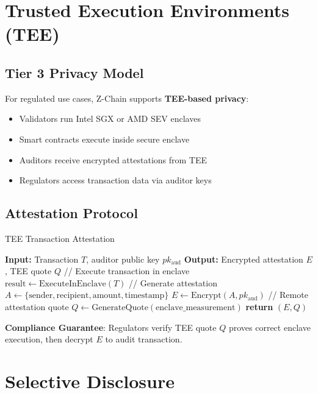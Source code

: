 \documentclass[11pt]{article}
\begin{document}
\section{Trusted Execution Environments (TEE)}

\subsection{Tier 3 Privacy Model}

For regulated use cases, Z-Chain supports \textbf{TEE-based privacy}:

\begin{itemize}[leftmargin=1.1em]
  \item Validators run Intel SGX or AMD SEV enclaves
  \item Smart contracts execute inside secure enclave
  \item Auditors receive encrypted attestations from TEE
  \item Regulators access transaction data via auditor keys
\end{itemize}

\subsection{Attestation Protocol}

\begin{algorithm}[H]
\caption{TEE Transaction Attestation}
\begin{algorithmic}[1]
\State \textbf{Input:} Transaction $T$, auditor public key $pk_{\text{aud}}$
\State \textbf{Output:} Encrypted attestation $E$, TEE quote $Q$
\State
\State // Execute transaction in enclave
\State $\text{result} \leftarrow \text{ExecuteInEnclave}(T)$
\State
\State // Generate attestation
\State $A \leftarrow \{\text{sender}, \text{recipient}, \text{amount}, \text{timestamp}\}$
\State $E \leftarrow \text{Encrypt}(A, pk_{\text{aud}})$ 
\State
\State // Remote attestation quote
\State $Q \leftarrow \text{GenerateQuote}(\text{enclave\_measurement})$
\State \textbf{return} $(E, Q)$
\end{algorithmic}
\end{algorithm}

\textbf{Compliance Guarantee}: Regulators verify TEE quote $Q$ proves correct enclave execution, then decrypt $E$ to audit transaction.

\section{Selective Disclosure}
\end{document}
